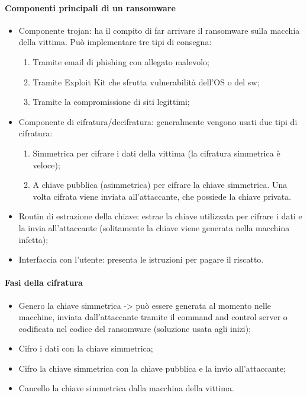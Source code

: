 \paragraph{Componenti principali di un ransomware}
\begin{itemize}
    \item Componente trojan: ha il compito di far arrivare il ransomware sulla macchia della vittima. Può implementare tre tipi di consegna:
	\begin{enumerate}
        \item Tramite email di phishing con allegato malevolo;
        \item Tramite Exploit Kit che sfrutta vulnerabilità dell'OS o del sw;
        \item Tramite la compromissione di siti legittimi;
	\end{enumerate}
    \item Componente di cifratura/decifratura: generalmente vengono usati due tipi di cifratura:
    	\begin{enumerate}
    	    \item Simmetrica per cifrare i dati della vittima (la cifratura simmetrica è veloce);
    	    \item A chiave pubblica (asimmetrica) per cifrare la chiave simmetrica. Una volta cifrata viene inviata all'attaccante, che possiede la chiave privata.
    	\end{enumerate}
    \item Routin di estrazione della chiave: estrae la chiave utilizzata per cifrare i dati e la invia all'attaccante (solitamente la chiave viene generata nella macchina infetta);
    \item Interfaccia con l'utente: presenta le istruzioni per pagare il riscatto.
\end{itemize}

\paragraph{Fasi della cifratura}
\begin{itemize}
    \item Genero la chiave simmetrica -> può essere generata al momento nelle macchine, inviata dall'attaccante tramite il command and control server o codificata nel codice del ransomware (soluzione usata agli inizi);
    \item Cifro i dati con la chiave simmetrica;
    \item Cifro la chiave simmetrica con la chiave pubblica e la invio all'attaccante;
    \item Cancello la chiave simmetrica dalla macchina della vittima.
\end{itemize}

